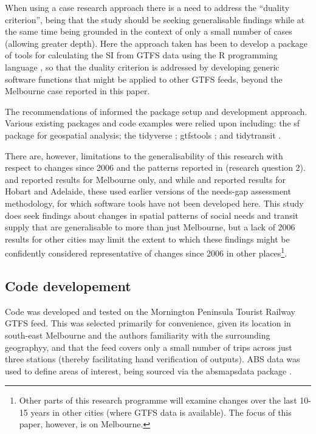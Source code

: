 \documentclass[preprint, 3p,
authoryear]{elsarticle} %
\begin{document}
When using a case research approach there is a need to address the
``duality criterion'', being that the study should be seeking
generalisable findings while at the same time being grounded in the
context of only a small number of cases (allowing greater
depth)\citep{Denscombe2007aa, Ketokivi2014aa}. Here the approach taken
has been to develop a package of tools for calculating the SI from GTFS
data using the R programming language \citep{R-base}, so that the
duality criterion is addressed by developing generic software functions
that might be applied to other GTFS feeds, beyond the Melbourne case
reported in this paper.

The recommendations of \citet{wickham2023r} informed the package setup
and development approach. Various existing packages and code examples
were relied upon including: the sf package \citep{R-sf} for geospatial
analysis; the tidyverse \citep{tidyverse2019}; gtfstools
\citep{R-gtfstools}; and tidytransit \citep{R-tidytransit}.

There are, however, limitations to the generalisability of this research
with respect to changes since 2006 and the patterns reported in
\citet{currie2010identifying}(research question 2).
\citet{Currie2007Identifying} and \citet{currie2010identifying} reported
results for Melbourne only, and while \citet{Currie2003Hobart} and
\citet{Currie2004Gap} reported results for Hobart and Adelaide, these
used earlier versions of the needs-gap assessment methodology, for which
software tools have not been developed here. This study does seek
findings about changes in spatial patterns of social needs and transit
supply that are generalisable to more than just Melbourne, but a lack of
2006 results for other cities may limit the extent to which these
findings might be confidently considered representative of changes since
2006 in other places\footnote{Other parts of this research programme
  will examine changes over the last 10-15 years in other cities (where
  GTFS data is available). The focus of this paper, however, is on
  Melbourne.}.

\subsection{Code developement}\label{code-developement}

Code was developed and tested on the Mornington Peninsula Tourist
Railway GTFS feed. This was selected primarily for convenience, given
its location in south-east Melbourne and the authors familiarity with
the surrounding geographyy, and that the feed covers only a small number
of trips across just three stations (thereby facilitating hand
verification of outputs). ABS data was used to define areas of interest,
being sourced via the absmapsdata package \citep{R-absmapsdata}.
\end{document}
